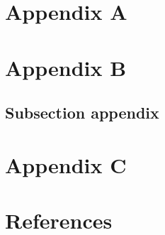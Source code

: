 











\begin{appendices}
        \chapter{Appendix A}
        
        
        \chapter{Appendix B}
        \section{Subsection appendix}
        
        \chapter{Appendix C}
        
\end{appendices}



\newpage
\cleardoublepage{}
\chapter*{References}
\begin{spacing}{1}
        
        \Charter
        \setlength\bibitemsep{\baselineskip}
        
\end{spacing}

